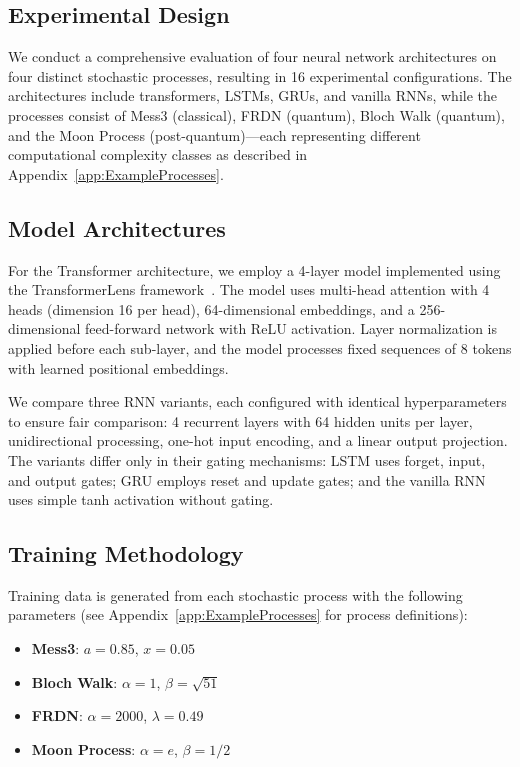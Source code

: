 \documentclass[prx,nofootinbib,onecolumn,showkeys,groupaddress,preprintnumbers,floatfix,
superscriptaddress]{revtex4-1}
\begin{document}
\subsection{Experimental Design}

We conduct a comprehensive evaluation of four neural network architectures on four distinct stochastic processes, resulting in 16 experimental configurations. The architectures include transformers, LSTMs, GRUs, and vanilla RNNs, while the processes consist of Mess3 (classical), FRDN (quantum), Bloch Walk (quantum), and the Moon Process (post-quantum)---each representing different computational complexity classes as described in Appendix~\ref{app:ExampleProcesses}.

\subsection{Model Architectures}

For the Transformer architecture, we employ a 4-layer model implemented using the TransformerLens framework~\citep{nanda2022transformerlens}. The model uses multi-head attention with 4 heads (dimension 16 per head), 64-dimensional embeddings, and a 256-dimensional feed-forward network with ReLU activation. Layer normalization is applied before each sub-layer, and the model processes fixed sequences of 8 tokens with learned positional embeddings.

We compare three RNN variants, each configured with identical hyperparameters to ensure fair comparison: 4 recurrent layers with 64 hidden units per layer, unidirectional processing, one-hot input encoding, and a linear output projection. The variants differ only in their gating mechanisms: LSTM uses forget, input, and output gates; GRU employs reset and update gates; and the vanilla RNN uses simple tanh activation without gating.

\subsection{Training Methodology}

Training data is generated from each stochastic process with the following parameters (see Appendix~\ref{app:ExampleProcesses} for process definitions):
\begin{itemize}
    \item \textbf{Mess3}: $a=0.85$, $x=0.05$
    \item \textbf{Bloch Walk}: $\alpha=1$, $\beta=\sqrt{51}$
    \item \textbf{FRDN}: $\alpha=2000$, $\lambda=0.49$  
    \item \textbf{Moon Process}: $\alpha=e$, $\beta=1/2$
\end{itemize}
\end{document}
